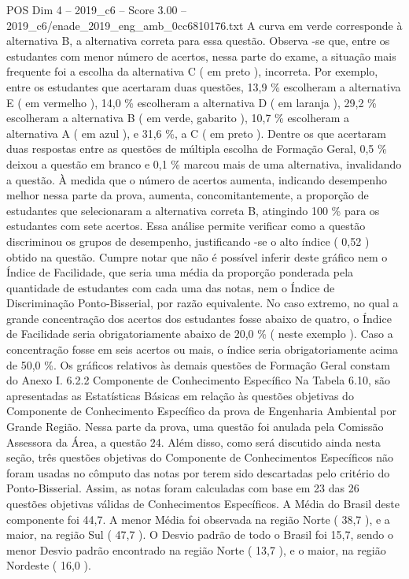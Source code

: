\begin{textsample}{POS Dim 4 – 2019\_c6 – Score 3.00 – 2019\_c6/enade\_2019\_eng\_amb\_0cc6810176.txt}
A curva em verde corresponde à alternativa B, a alternativa correta para essa questão.
Observa -se que, entre os estudantes com menor número de acertos, nessa parte do exame, a situação mais frequente foi a escolha da alternativa C ( em preto ), incorreta.
Por exemplo, entre os estudantes que acertaram duas questões, 13,9 \% escolheram a alternativa E ( em vermelho ), 14,0 \% escolheram a alternativa D ( em laranja ), 29,2 \% escolheram a alternativa B ( em verde, gabarito ), 10,7 \% escolheram a alternativa A ( em azul ), e 31,6 \%, a C ( em preto ).
Dentre os que acertaram duas respostas entre as questões de múltipla escolha de Formação Geral, 0,5 \% deixou a questão em branco e 0,1 \% marcou mais de uma alternativa, invalidando a questão.
À medida que o número de acertos aumenta, indicando desempenho melhor nessa parte da prova, aumenta, concomitantemente, a proporção de estudantes que selecionaram a alternativa correta B, atingindo 100 \% para os estudantes com sete acertos.
Essa análise permite verificar como a questão discriminou os grupos de desempenho, justificando -se o alto índice ( 0,52 ) obtido na questão.
Cumpre notar que não é possível inferir deste gráfico nem o Índice de Facilidade, que seria uma média da proporção ponderada pela quantidade de estudantes com cada uma das notas, nem o Índice de Discriminação Ponto-Bisserial, por razão equivalente.
No caso extremo, no qual a grande concentração dos acertos dos estudantes fosse abaixo de quatro, o Índice de Facilidade seria obrigatoriamente abaixo de 20,0 \% ( neste exemplo ).
Caso a concentração fosse em seis acertos ou mais, o índice seria obrigatoriamente acima de 50,0 \%.
Os gráficos relativos às demais questões de Formação Geral constam do Anexo I. 6.2.2 Componente de Conhecimento Específico Na Tabela 6.10, são apresentadas as Estatísticas Básicas em relação às questões objetivas do Componente de Conhecimento Específico da prova de Engenharia Ambiental por Grande Região.
Nessa parte da prova, uma questão foi anulada pela Comissão Assessora da Área, a questão 24.
Além disso, como será discutido ainda nesta seção, três questões objetivas do Componente de Conhecimentos Específicos não foram usadas no cômputo das notas por terem sido descartadas pelo critério do Ponto-Bisserial.
Assim, as notas foram calculadas com base em 23 das 26 questões objetivas válidas de Conhecimentos Específicos.
A Média do Brasil deste componente foi 44,7.
A menor Média foi observada na região Norte ( 38,7 ), e a maior, na região Sul ( 47,7 ).
O Desvio padrão de todo o Brasil foi 15,7, sendo o menor Desvio padrão encontrado na região Norte ( 13,7 ), e o maior, na região Nordeste ( 16,0 ).

\end{textsample}

